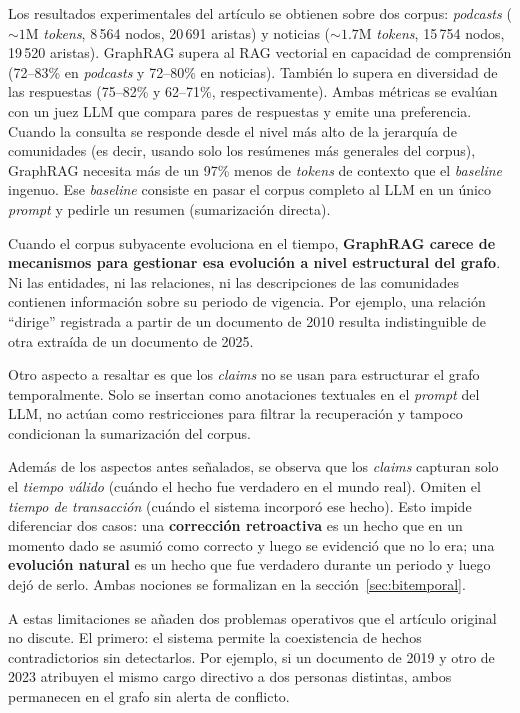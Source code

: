 Los resultados experimentales del artículo \cite{edge2024local} se obtienen sobre dos corpus: \emph{podcasts} (${\sim}1$M \emph{tokens}, 8\,564 nodos, 20\,691 aristas) y noticias (${\sim}1.7$M \emph{tokens}, 15\,754 nodos, 19\,520 aristas). GraphRAG supera al RAG vectorial en capacidad de comprensión (72--83\% en \emph{podcasts} y 72--80\% en noticias). También lo supera en diversidad de las respuestas (75--82\% y 62--71\%, respectivamente). Ambas métricas se evalúan con un juez LLM que compara pares de respuestas y emite una preferencia. Cuando la consulta se responde desde el nivel más alto de la jerarquía de comunidades (es decir, usando solo los resúmenes más generales del corpus), GraphRAG necesita más de un 97\% menos de \emph{tokens} de contexto que el \emph{baseline} ingenuo. Ese \emph{baseline} consiste en pasar el corpus completo al LLM en un único \emph{prompt} y pedirle un resumen (sumarización directa).

Cuando el corpus subyacente evoluciona en el tiempo, \textbf{GraphRAG carece de mecanismos para gestionar esa evolución a nivel estructural del grafo}. Ni las entidades, ni las relaciones, ni las descripciones de las comunidades contienen información sobre su periodo de vigencia. Por ejemplo, una relación ``dirige'' registrada a partir de un documento de 2010 resulta indistinguible de otra extraída de un documento de 2025.

Otro aspecto a resaltar es que los \emph{claims} no se usan para estructurar el grafo temporalmente. Solo se insertan como anotaciones textuales en el \emph{prompt} del LLM, no actúan como restricciones para filtrar la recuperación y tampoco condicionan la sumarización del corpus.

Además de los aspectos antes señalados, se observa que los \emph{claims} capturan solo el \emph{tiempo válido} (cuándo el hecho fue verdadero en el mundo real). Omiten el \emph{tiempo de transacción} (cuándo el sistema incorporó ese hecho). Esto impide diferenciar dos casos: una \textbf{corrección retroactiva} es un hecho que en un momento dado se asumió como correcto y luego se evidenció que no lo era; una \textbf{evolución natural} es un hecho que fue verdadero durante un periodo y luego dejó de serlo. Ambas nociones se formalizan en la sección~\ref{sec:bitemporal}.

A estas limitaciones se añaden dos problemas operativos que el artículo original no discute. El primero: el sistema permite la coexistencia de hechos contradictorios sin detectarlos. Por ejemplo, si un documento de 2019 y otro de 2023 atribuyen el mismo cargo directivo a dos personas distintas, ambos permanecen en el grafo sin alerta de conflicto.

